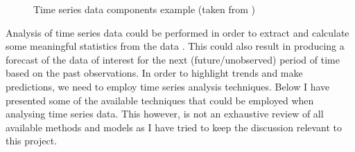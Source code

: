 \begin{figure}[ht]
	\caption{Time series data components example (taken from \cite{wildchance})}%
	\label{fig:timeSeriesDataComponents}
\end{figure}

Analysis of time series data could be performed in order to extract and calculate some meaningful statistics from the data \cite{shumway2010time}. This could also result in producing a forecast of the data of interest for the next (future/unobserved) period of time based on the past observations. In order to highlight trends and make predictions, we need to employ time series analysis techniques. Below I have presented some of the available techniques that could be employed when analysing time series data. This however, is not an exhaustive review of all available methods and models as I have tried to keep the discussion relevant to this project.


